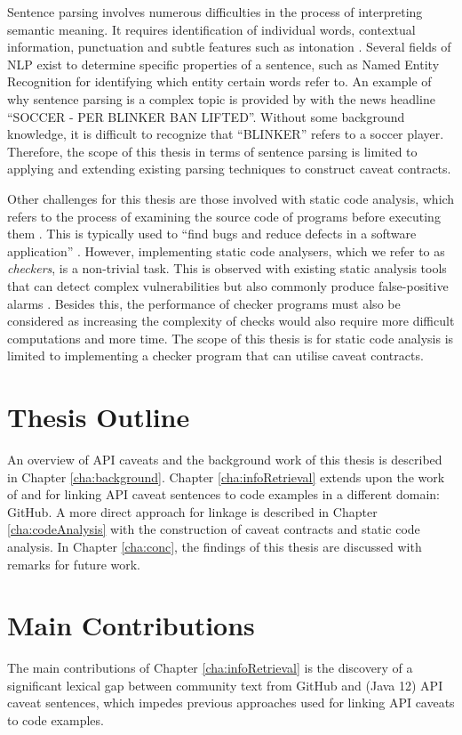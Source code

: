 Sentence parsing involves numerous difficulties in the process of interpreting semantic meaning. It requires identification of individual words, contextual information, punctuation and subtle features such as intonation \cite{mitchell1994sentence}. Several fields of NLP exist to determine specific properties of a sentence, such as Named Entity Recognition for identifying which entity certain words refer to. An example of why sentence parsing is a complex topic is provided by \cite{ratinov-roth-2009-design} with the news headline ``SOCCER - PER BLINKER BAN LIFTED''. Without some background knowledge, it is difficult to recognize that ``BLINKER'' refers to a soccer player.  Therefore, the scope of this thesis in terms of sentence parsing is limited to applying and extending existing parsing techniques to construct caveat contracts. \bigbreak

Other challenges for this thesis are those involved with static code analysis, which refers to the process of examining the source code of programs before executing them \cite{baca2009static}. This is typically used to ``find bugs and reduce defects in a software application'' \cite{bardas2010static}. However, implementing static code analysers, which we refer to as \textit{checkers}, is a non-trivial task. This is observed with existing static analysis tools that can detect complex vulnerabilities but also commonly produce false-positive alarms \cite{zitser2004testing}. Besides this, the performance of checker programs must also be considered as increasing the complexity of checks would also require more difficult computations and more time. The scope of this thesis is for static code analysis is limited to implementing a checker program that can utilise caveat contracts. 
\clearpage
\section{Thesis Outline}
\label{sec:outline}
An overview of API caveats and the background work of this thesis is described in Chapter \ref{cha:background}. Chapter \ref{cha:infoRetrieval} extends upon the work of \cite{jiamou} and \cite{xiaoxue} for linking API caveat sentences to code examples in a different domain: GitHub. A more direct approach for linkage is described in Chapter \ref{cha:codeAnalysis} with the construction of caveat contracts and static code analysis. In Chapter \ref{cha:conc}, the findings of this thesis are discussed with remarks for future work.

\section{Main Contributions}
The main contributions of Chapter \ref{cha:infoRetrieval} is the discovery of a significant lexical gap between community text from GitHub and (Java 12) API caveat sentences, which impedes previous approaches used for linking API caveats to code examples.\\

